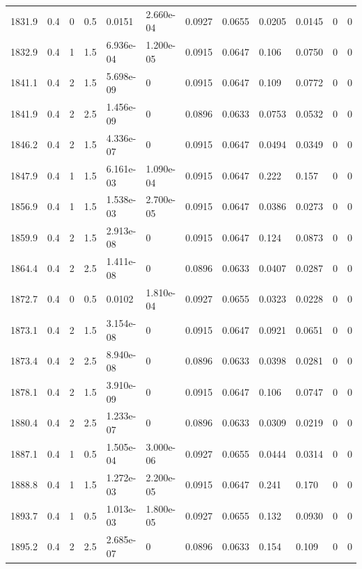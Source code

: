 \documentclass[preview]{standalone}
\begin{document}
{{{{{{{{{{{\begin{tabular}{L{1.2cm}C{1.2cm} C{0.3cm}C{0.5cm} C{1.4cm}C{1.4cm} C{1.4cm}C{1.4cm} C{1.6cm}C{1.6cm} C{1.6cm}C{1.6cm}}
  1831.9  &   0.4  & 0     & 0.5 &  0.0151  & 2.660e-04  &  0.0927&   0.0655& 0.0205 & 0.0145   &  0 & 0  \\ 
  1832.9  &   0.4  & 1     & 1.5 &  6.936e-04  & 1.200e-05  &  0.0915&   0.0647& 0.106 & 0.0750   &  0 & 0  \\ 
  1841.1  &   0.4  & 2     & 1.5 &  5.698e-09  & 0  &  0.0915&   0.0647& 0.109 & 0.0772   &  0 & 0  \\ 
  1841.9  &   0.4  & 2     & 2.5 &  1.456e-09  & 0  &  0.0896&   0.0633& 0.0753 & 0.0532   &  0 & 0  \\ 
  1846.2  &   0.4  & 2     & 1.5 &  4.336e-07  & 0  &  0.0915&   0.0647& 0.0494 & 0.0349   &  0 & 0  \\ 
  1847.9  &   0.4  & 1     & 1.5 &  6.161e-03  & 1.090e-04  &  0.0915&   0.0647& 0.222 & 0.157   &  0 & 0  \\ 
  1856.9  &   0.4  & 1     & 1.5 &  1.538e-03  & 2.700e-05  &  0.0915&   0.0647& 0.0386 & 0.0273   &  0 & 0  \\ 
  1859.9  &   0.4  & 2     & 1.5 &  2.913e-08  & 0  &  0.0915&   0.0647& 0.124 & 0.0873   &  0 & 0  \\ 
  1864.4  &   0.4  & 2     & 2.5 &  1.411e-08  & 0  &  0.0896&   0.0633& 0.0407 & 0.0287   &  0 & 0  \\ 
  1872.7  &   0.4  & 0     & 0.5 &  0.0102  & 1.810e-04  &  0.0927&   0.0655& 0.0323 & 0.0228   &  0 & 0  \\ 
  1873.1  &   0.4  & 2     & 1.5 &  3.154e-08  & 0  &  0.0915&   0.0647& 0.0921 & 0.0651   &  0 & 0  \\ 
  1873.4  &   0.4  & 2     & 2.5 &  8.940e-08  & 0  &  0.0896&   0.0633& 0.0398 & 0.0281   &  0 & 0  \\ 
  1878.1  &   0.4  & 2     & 1.5 &  3.910e-09  & 0  &  0.0915&   0.0647& 0.106 & 0.0747   &  0 & 0  \\ 
  1880.4  &   0.4  & 2     & 2.5 &  1.233e-07  & 0  &  0.0896&   0.0633& 0.0309 & 0.0219   &  0 & 0  \\ 
  1887.1  &   0.4  & 1     & 0.5 &  1.505e-04  & 3.000e-06  &  0.0927&   0.0655& 0.0444 & 0.0314   &  0 & 0  \\ 
  1888.8  &   0.4  & 1     & 1.5 &  1.272e-03  & 2.200e-05  &  0.0915&   0.0647& 0.241 & 0.170   &  0 & 0  \\ 
  1893.7  &   0.4  & 1     & 0.5 &  1.013e-03  & 1.800e-05  &  0.0927&   0.0655& 0.132 & 0.0930   &  0 & 0  \\ 
  1895.2  &   0.4  & 2     & 2.5 &  2.685e-07  & 0  &  0.0896&   0.0633& 0.154 & 0.109   &  0 & 0  \\ 

\end{tabular}}}}}}}}}}}}
\end{document}

